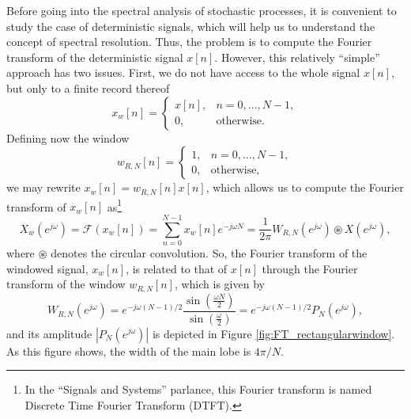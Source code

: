 Before going into the spectral analysis of stochastic processes, it is convenient to study the case of deterministic signals, which will help us to understand the concept of spectral resolution. Thus, the problem is to compute the Fourier transform of the deterministic signal $x[n]$. However, this relatively ``simple'' approach has two issues. First, we do not have access to the whole signal $x[n]$, but only to a finite record thereof
\begin{equation}
   x_w[n]  = \begin{cases}
   x[n], & n = 0, \ldots, N-1, \\
   0, & \text{otherwise.}
   \end{cases}
\end{equation}
Defining now the window
\begin{equation}
w_{R,N}[n]  = \begin{cases}
1, & n = 0, \ldots, N-1, \\
0, & \text{otherwise,}
\end{cases}
\end{equation}
we may rewrite $x_w[n] = w_{R,N}[n] x[n]$, which allows us to compute the Fourier transform of $x_w[n]$ as\footnote{In the ``Signals and Systems'' parlance, this Fourier transform is named Discrete Time Fourier Transform (DTFT).}
\begin{equation}
\label{eq:DTFT}
X_w(e^{j \omega}) = \mathcal{F} \left(x_w[n]\right) = \sum_{n = 0}^{N-1} x_w[n] e^{- j \omega N} = \frac{1}{2 \pi} W_{R,N}(e^{j \omega}) \circledast X(e^{j \omega}),
\end{equation}
where $\circledast$ denotes the circular convolution. So, the Fourier transform of the windowed signal, $x_w[n]$, is related to that of $x[n]$ through the Fourier transform of the window $w_{R,N}[n]$, which is given by
\begin{equation}
W_{R,N}(e^{j \omega}) = e^{-j \omega (N-1)/2} \frac{\sin\left(\frac{\omega N}{2}\right)}{\sin\left(\frac{\omega}{2}\right)} = e^{-j \omega (N-1)/2} P_N(e^{j \omega}),
\end{equation}
and its amplitude $|P_N(e^{j \omega})|$ is depicted in Figure \ref{fig:FT_rectangularwindow}. As this figure shows, the width of the main lobe is $4 \pi/N$.

